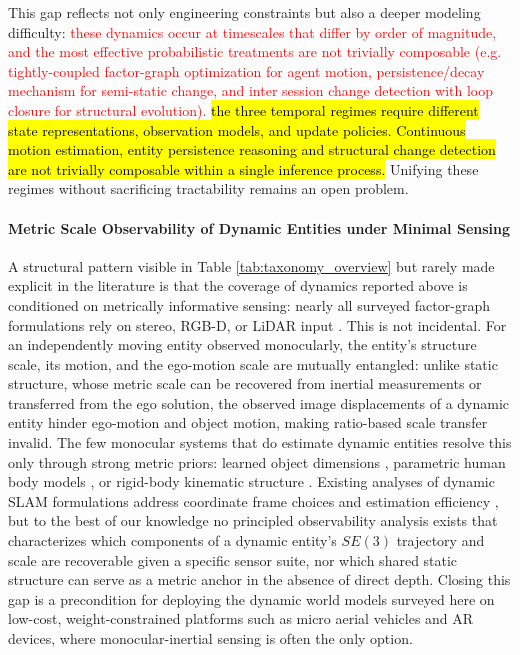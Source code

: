 This gap reflects not only engineering constraints but also a deeper modeling difficulty: \textcolor{red}{these dynamics occur at timescales that differ by order of magnitude, and the most effective probabilistic treatments are not trivially composable (e.g.  tightly-coupled factor-graph optimization for agent motion, persistence/decay mechanism for semi-static change, and inter session change detection with loop closure for structural evolution).} \hl{the three temporal regimes require different state representations, observation models, and update policies. Continuous motion estimation, entity persistence reasoning and structural change detection are not trivially composable within a single inference process.}
Unifying these regimes without sacrificing tractability remains an open problem.

\paragraph{Metric Scale Observability of Dynamic Entities under Minimal Sensing}
A structural pattern visible in Table \ref{tab:taxonomy_overview} but rarely made explicit in the literature is that the coverage of dynamics reported above is conditioned on metrically informative sensing: nearly all surveyed factor-graph formulations rely on stereo, RGB-D, or LiDAR input \cite{bescos_dynaslam_2021} \cite{morris_dynosam_2025} \cite{qiu2022airdos} \cite{gou_visual_2024}. 
This is not incidental. For an independently moving entity observed monocularly, the entity's structure scale, its motion, and the ego-motion scale are mutually entangled: unlike static structure, whose metric scale can be recovered from inertial measurements or transferred from the ego solution, the observed image displacements of a dynamic entity hinder ego-motion and object motion, making ratio-based scale transfer invalid.
The few monocular systems that do estimate dynamic entities resolve this only through strong metric priors: learned object dimensions \cite{yang_cubeslam_2019}, parametric human body models \cite{henning_bodyslam_2022} \cite{henning_bodyslam_2023}, or rigid-body kinematic structure \cite{qiu2022airdos}.
Existing analyses of dynamic SLAM formulations address coordinate frame choices \cite{morris_importance_2024} and estimation efficiency \cite{henein_dynamic_2020}, but to the best of our knowledge no principled observability analysis exists that characterizes which components of a dynamic entity's $SE(3)$ trajectory and scale are recoverable given a specific sensor suite, nor which shared static structure can serve as a metric anchor in the absence of direct depth. 
Closing this gap is a precondition for deploying the dynamic world models surveyed here on low-cost, weight-constrained platforms such as micro aerial vehicles and AR devices, where monocular-inertial sensing is often the only option.

